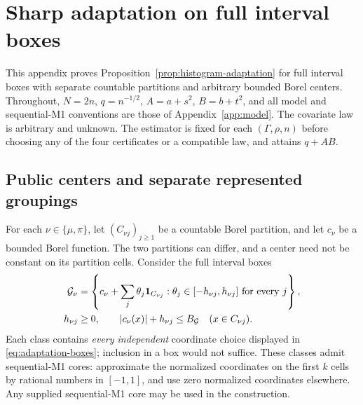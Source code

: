 \section{Sharp adaptation on full interval boxes}
\label{app:budget-adaptation}

This appendix proves Proposition~\ref{prop:histogram-adaptation} for full
interval boxes with separate countable partitions and arbitrary bounded
Borel centers. Throughout, $N=2n$, $q=n^{-1/2}$, $A=a+s^2$, $B=b+t^2$,
and all model and sequential-M1 conventions are those of
Appendix~\ref{app:model}. The covariate law is arbitrary and unknown.
The estimator is fixed for each $(\Gamma,\rho,n)$ before choosing any
of the four certificates or a compatible law, and attains $q+AB$.

\subsection{Public centers and separate represented groupings}

For each $\nu\in\{\mu,\pi\}$, let $(C_{\nu j})_{j\ge1}$ be a
countable Borel partition, and let $c_\nu$ be a bounded Borel function.
The two partitions can differ, and a center need not be constant on
its partition cells. Consider the full interval boxes
\begin{equation}
 \begin{aligned}
 \mathcal G_\nu&=
 \left\{c_\nu+\sum_j\theta_j\mathbf 1_{C_{\nu j}}:
       \theta_j\in[-h_{\nu j},h_{\nu j}]\text{ for every }j\right\},\\
 h_{\nu j}&\ge0,\qquad |c_\nu(x)|+h_{\nu j}\le B_{\mathcal G}
               \quad(x\in C_{\nu j}).
 \end{aligned}
 \label{eq:adaptation-boxes}
\end{equation}
Each class contains \emph{every independent} coordinate choice displayed in
\eqref{eq:adaptation-boxes}; inclusion in a box would not suffice.
These classes admit sequential-M1 cores: approximate the normalized
coordinates on the first $k$ cells by rational numbers in $[-1,1]$, and
use zero normalized coordinates elsewhere. Any supplied sequential-M1
core may be used in the construction.

